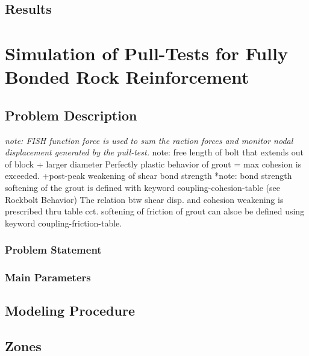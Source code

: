 \documentclass[a4paper, nobind]{templates/ociamthesis}
\begin{document}
\hypertarget{results-1}{%
\section{Results}\label{results-1}}

\newpage

\hypertarget{simulation-of-pull-tests-for-fully-bonded-rock-reinforcement}{%
\chapter{Simulation of Pull-Tests for Fully Bonded Rock Reinforcement}\label{simulation-of-pull-tests-for-fully-bonded-rock-reinforcement}}

\hypertarget{problem-description-1}{%
\section{Problem Description}\label{problem-description-1}}

\emph{note: FISH function force is used to sum the raction forces and
monitor nodal displacement generated by the pull-test.
}note: free length of bolt that extends out of block + larger diameter
Perfectly plastic behavior of grout = max cohesion is exceeded.
+post-peak weakening of shear bond strength
*note: bond strength softening of the grout is defined with keyword
coupling-cohesion-table (see Rockbolt Behavior)
The relation btw shear disp. and cohesion weakening is prescribed
thru table cct. softening of friction of grout can alsoe be defined
using keyword coupling-friction-table.

\hypertarget{problem-statement-1}{%
\subsection{Problem Statement}\label{problem-statement-1}}

\hypertarget{main-parameters-1}{%
\subsection{Main Parameters}\label{main-parameters-1}}

\hypertarget{modeling-procedure-1}{%
\section{Modeling Procedure}\label{modeling-procedure-1}}

\hypertarget{zones-1}{%
\section{Zones}\label{zones-1}}
\end{document}
